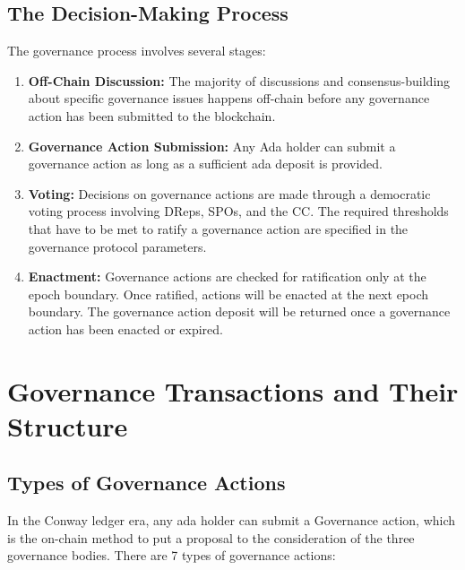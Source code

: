 \subsection{The Decision-Making Process}

The governance process involves several stages:

\begin{enumerate}
    \item \textbf{Off-Chain Discussion:} The majority of discussions and consensus-building about specific governance issues happens off-chain before any governance action has been submitted to the blockchain.
    \item \textbf{Governance Action Submission:} Any Ada holder can submit a governance action as long as a sufficient ada deposit is provided.
    \item \textbf{Voting:} Decisions on governance actions are made through a democratic voting process involving DReps, SPOs, and the CC. The required thresholds that have to be met to ratify a governance action are specified in the governance protocol parameters.
    \item \textbf{Enactment:} Governance actions are checked for ratification only at the epoch boundary. Once ratified, actions will be enacted at the next epoch boundary. The governance action deposit will be returned once a governance action has been enacted or expired.
\end{enumerate}


\section{Governance Transactions and Their Structure} \label{sec:governance-transactions}

\subsection{Types of Governance Actions}

In the Conway ledger era, any ada holder can submit a Governance action, which is the on-chain method to put a proposal to the consideration of the three governance bodies. There are 7 types of governance actions:

